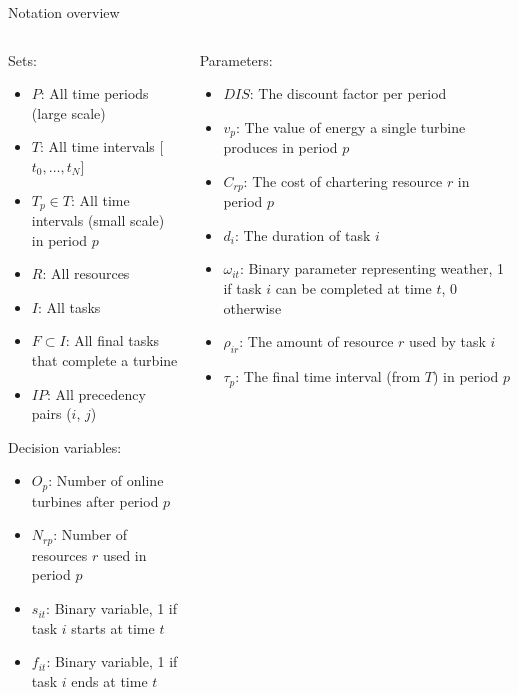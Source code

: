 \documentclass{beamer}
\begin{document}
\begin{frame}{Notation overview}
\scriptsize

\begin{columns}
\begin{column}{.48\textwidth}
Sets:
\begin{itemize}
\item $P$: All time periods (large scale)
\item $T$: All time intervals [$t_0, \dots , t_N$]
\item $T_p \in T$: All time intervals (small scale) in period $p$
\item $R$: All resources
\item $I$: All tasks
\item $F \subset I$: All final tasks that complete a turbine
\item $IP$: All precedency pairs ($i$, $j$)
\end{itemize}

Decision variables:
\begin{itemize}
\item $O_{p}$: Number of online turbines after period $p$
\item $N_{rp}$: Number of resources $r$ used in period $p$
\item $s_{it}$: Binary variable, 1 if task $i$ starts at time $t$
\item $f_{it}$: Binary variable, 1 if task $i$ ends at time $t$
\end{itemize}
\end{column}

\hfill

\begin{column}{.48\textwidth}
Parameters:
\begin{itemize}
\item $DIS$: The discount factor per period
\item $v_p$: The value of energy a single turbine produces in period $p$
\item $C_{rp}$: The cost of chartering resource $r$ in period $p$
\item $d_i$: The duration of task $i$
\item $\omega_{it}$: Binary parameter representing weather, 1 if task $i$ can be completed at time $t$, 0 otherwise
\item $\rho_{ir}$: The amount of resource $r$ used by task $i$
\item $\tau_p$: The final time interval (from $T$) in period $p$
\end{itemize}
\end{column}
\end{columns}

\end{frame}
\end{document}
